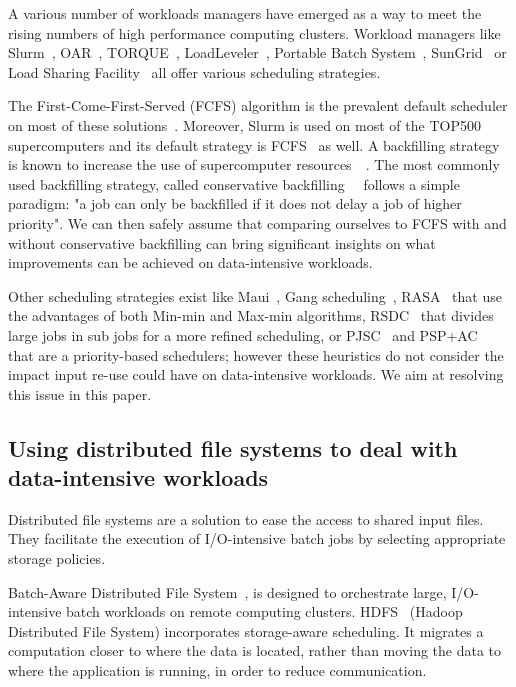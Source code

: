 \documentclass[sigconf,review,anonymous]{acmart}
\begin{document}
A various number of workloads managers have emerged 
as a way to meet the rising numbers of high performance computing clusters.
Workload managers like Slurm~\cite{SLURM}, OAR~\cite{oar},
TORQUE~\cite{torque}, LoadLeveler~\cite{loadleveler},
Portable Batch System~\cite{pbs}, SunGrid~\cite{sungrid}
or Load Sharing Facility~\cite{lsf} all offer
various scheduling strategies.

The First-Come-First-Served (FCFS) algorithm is the prevalent default
scheduler on most of these solutions~\cite{survey_workload_manager_and_scheduler}.
Moreover, Slurm is used on most of the TOP500 supercomputers and its default strategy is FCFS~\cite{slurm_website_scheduling} as well.
A backfilling strategy is known to increase
the use of supercomputer resources~\cite{maui}~\cite{New_Backfill}. 
The most commonly used backfilling strategy, called conservative 
backfilling~\cite{Characterization_of_Backfilling}~\cite{Introducing-New-Backfill-based} follows
a simple paradigm: "a job can only be backfilled if it does not
delay a job of higher priority".
We can then safely assume that comparing ourselves to FCFS with and without conservative backfilling can 
bring significant insights on what improvements can be achieved on data-intensive workloads.

Other scheduling strategies exist like 
Maui~\cite{Maui_Scheduler}, Gang scheduling~\cite{gang_scheduling}, 
RASA~\cite{rasa} that use the advantages of both Min-min and Max-min algorithms,
RSDC~\cite{rsdc} that divides large jobs in sub jobs for a more refined scheduling,
or PJSC~\cite{pjsc} and PSP+AC~\cite{PSP_AC} that are a priority-based schedulers; 
however these heuristics do not consider the impact
input re-use could have on data-intensive workloads.
We aim at resolving this issue in this paper.

\subsection{Using distributed file systems to deal with data-intensive workloads}

Distributed file systems are a solution to ease the access to 
shared input files. They facilitate the execution of I/O-intensive batch
jobs by selecting appropriate storage policies.

Batch-Aware Distributed File System~\cite{Explicit_Control_in_a_Batch-Aware_Distributed_File_System},
is designed to orchestrate large, I/O-intensive batch workloads on remote computing clusters.
HDFS~\cite{hdfs} (Hadoop Distributed File System)
incorporates storage-aware scheduling. 
It migrates a computation closer to where the data is
located, rather than moving the data to where the application is
running, in order to reduce communication.
\end{document}

